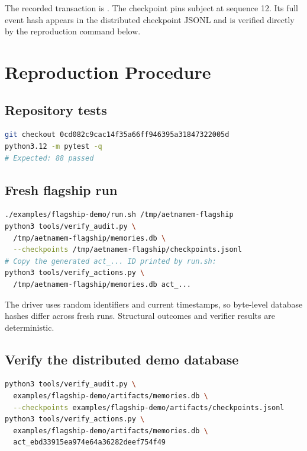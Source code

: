 The recorded transaction is .
The checkpoint pins subject  at sequence 12. Its full event
hash appears in the distributed checkpoint JSONL and is verified directly by
the reproduction command below.

\section{Reproduction Procedure}

\subsection{Repository tests}

\begin{lstlisting}[language=bash]
git checkout 0cd082c9cac14f35a66ff946395a31847322005d
python3.12 -m pytest -q
# Expected: 88 passed
\end{lstlisting}

\subsection{Fresh flagship run}

\begin{lstlisting}[language=bash]
./examples/flagship-demo/run.sh /tmp/aetnamem-flagship
python3 tools/verify_audit.py \
  /tmp/aetnamem-flagship/memories.db \
  --checkpoints /tmp/aetnamem-flagship/checkpoints.jsonl
# Copy the generated act_... ID printed by run.sh:
python3 tools/verify_actions.py \
  /tmp/aetnamem-flagship/memories.db act_...
\end{lstlisting}

The driver uses random identifiers and current timestamps, so byte-level database hashes differ across fresh runs. Structural outcomes and verifier results are deterministic.

\subsection{Verify the distributed demo database}

\begin{lstlisting}[language=bash]
python3 tools/verify_audit.py \
  examples/flagship-demo/artifacts/memories.db \
  --checkpoints examples/flagship-demo/artifacts/checkpoints.jsonl
python3 tools/verify_actions.py \
  examples/flagship-demo/artifacts/memories.db \
  act_ebd33915ea974e64a36282deef754f49
\end{lstlisting}

